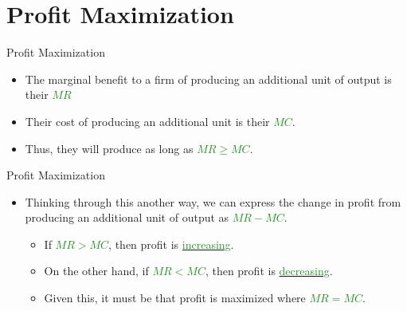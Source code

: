 \documentclass[xcolor={dvipsnames},pdf, hyperref={colorlinks=true, citecolor=ForestGreen, linkcolor=BlueViolet, urlcolor=Magenta}, handout]{beamer}
\newcommand{\dd}[1]{{\underline{\textcolor{ForestGreen}{#1}}}}
\begin{document}
\section{Profit Maximization}

\begin{frame}{Profit Maximization}
\begin{itemize}
	\item The marginal benefit to a firm of producing an additional unit of output is their \dd{$MR$}
	\item Their cost of producing an additional unit is their \dd{$MC$}. 
	\item Thus, they will produce as long as \dd{$MR \ge MC$}. 

\end{itemize}
\end{frame}

\begin{frame}{Profit Maximization}
	\begin{itemize}
		\item Thinking through this another way, we can express the change in profit from producing an additional unit of output as \dd{$MR - MC$}. 
		\begin{itemize}
			\item If \dd{$MR > MC$}, then profit is \dd{increasing}. 
			\item On the other hand, if \dd{$MR < MC$}, then profit is \dd{decreasing}. \item Given this, it must be that profit is maximized where \dd{$MR = MC$}.
		\end{itemize}
	\end{itemize}
\end{frame}
\end{document}

